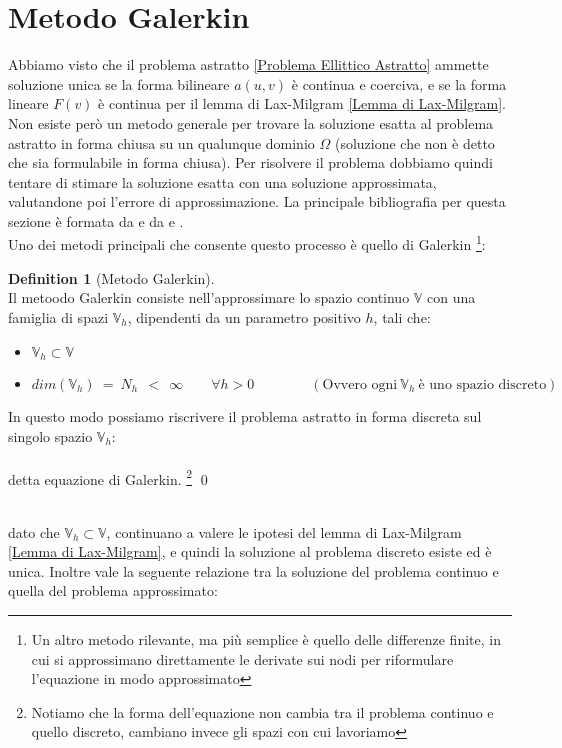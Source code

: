 \documentclass[12pt,a4paper]{report}
\theoremstyle{theorem}
\theoremstyle{definition}
\newtheorem{definition}{Definition}[section]
\begin{document}
\section{Metodo Galerkin}
Abbiamo visto che il problema astratto \ref{Problema Ellittico Astratto} ammette soluzione unica se la forma bilineare $a(u,v)$ è continua e coerciva, e se la forma lineare $F(v)$ è continua per il lemma di Lax-Milgram \ref{Lemma di Lax-Milgram}. Non esiste però un metodo generale per trovare la soluzione esatta al problema astratto in forma chiusa su un qualunque dominio $\Omega$ (soluzione che non è detto che sia formulabile in forma chiusa). Per risolvere il problema dobbiamo quindi tentare di stimare la soluzione esatta con una soluzione approssimata, valutandone poi l'errore di approssimazione. La principale bibliografia per questa sezione è formata da \cite{BS} e da \cite{Ciarlet} e \cite{Q}.\\
Uno dei metodi principali che consente questo processo è quello di Galerkin \footnote{Un altro metodo rilevante, ma più semplice è quello delle differenze finite, in cui si approssimano direttamente le derivate sui nodi per riformulare l'equazione in modo approssimato}:
\begin{definition} [Metodo Galerkin]  \label{Metodo Galerkin}
\hfill \\
Il metoodo Galerkin consiste nell'approssimare lo spazio continuo $\mathbb{V}$ con una famiglia di spazi $\mathbb{V}_{h}$, dipendenti da un parametro positivo $h$, tali che:
\begin{itemize}
	\item $\mathbb{V}_{h} \subset \mathbb{V}$
	\item $dim \left( \mathbb{V}_{h} \right) \ = \ N_{h} \ \ < \ \ \infty \qquad \forall h > 0 \qquad \qquad ( \text{Ovvero ogni} \ \mathbb{V}_{h} \ \text{è uno spazio discreto} )$
\end{itemize}
In questo modo possiamo riscrivere il problema astratto in forma discreta sul singolo spazio $\mathbb{V}_{h}$:
\\
\hfill \\
detta equazione di Galerkin. \footnote{Notiamo che la forma dell'equazione non cambia tra il problema continuo e quello discreto, cambiano invece gli spazi con cui lavoriamo}
\qed
\end{definition}
\hfill \\
dato che $\mathbb{V}_{h} \subset \mathbb{V}$, continuano a valere le ipotesi del lemma di Lax-Milgram \ref{Lemma di Lax-Milgram}, e quindi la soluzione al problema discreto esiste ed è unica. Inoltre vale la seguente relazione tra la soluzione del problema continuo e quella del problema approssimato:
\end{document}
